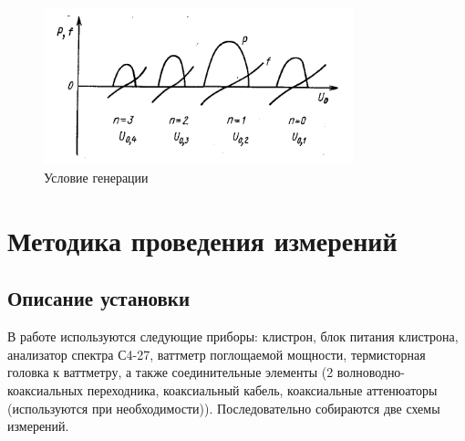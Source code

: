 \documentclass[a4paper,14pt]{extarticle}
\begin{document}
	\begin{figure}[h]
		\center
		\includegraphics[width = 0.8\textwidth]{images/zones.png}
		\caption{Условие генерации}
		\label{figz}
	\end{figure}
	
	\section{Методика проведения измерений}
	\subsection{Описание установки}
	В работе используются следующие приборы: клистрон, блок питания клистрона, анализатор спектра С4-27, ваттметр поглощаемой мощности, термисторная головка к ваттметру, а также соединительные элементы (2 волноводно-коаксиальных переходника, коаксиальный кабель,  коаксиальные аттенюаторы (используются при необходимости)). Последовательно собираются две схемы измерений.
	
\end{document}
